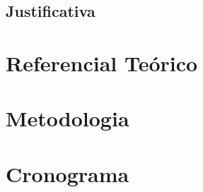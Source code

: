 \documentclass[a4paper,12pt,openany,oneside]{abntex2}
\begin{document}

\section{Justificativa}




\chapter{Referencial Teórico}




\chapter{Metodologia}




\chapter{Cronograma}





\end{document}
